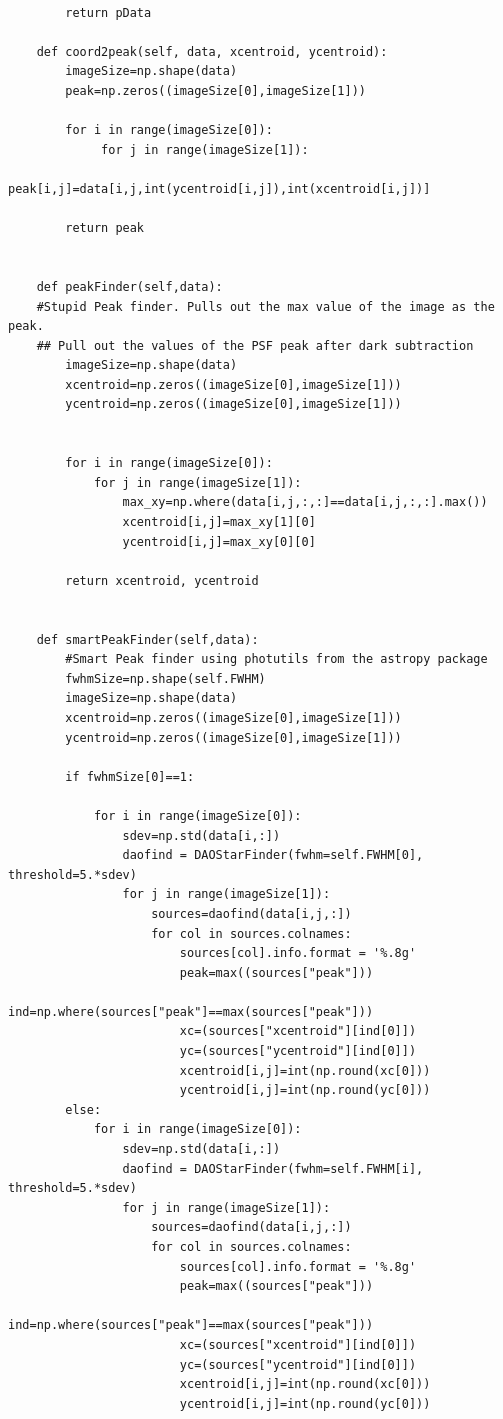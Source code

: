 \begin{lstlisting}
            
        return pData
    
    def coord2peak(self, data, xcentroid, ycentroid):
        imageSize=np.shape(data)
        peak=np.zeros((imageSize[0],imageSize[1]))

        for i in range(imageSize[0]):
             for j in range(imageSize[1]):
                    peak[i,j]=data[i,j,int(ycentroid[i,j]),int(xcentroid[i,j])]
        
        return peak
    
    
    def peakFinder(self,data):
    #Stupid Peak finder. Pulls out the max value of the image as the peak. 
    ## Pull out the values of the PSF peak after dark subtraction
        imageSize=np.shape(data)
        xcentroid=np.zeros((imageSize[0],imageSize[1]))
        ycentroid=np.zeros((imageSize[0],imageSize[1]))
        
        
        for i in range(imageSize[0]):
            for j in range(imageSize[1]):
                max_xy=np.where(data[i,j,:,:]==data[i,j,:,:].max())
                xcentroid[i,j]=max_xy[1][0]
                ycentroid[i,j]=max_xy[0][0]
            
        return xcentroid, ycentroid
        
        
    def smartPeakFinder(self,data):
        #Smart Peak finder using photutils from the astropy package
        fwhmSize=np.shape(self.FWHM)
        imageSize=np.shape(data)
        xcentroid=np.zeros((imageSize[0],imageSize[1]))
        ycentroid=np.zeros((imageSize[0],imageSize[1]))
        
        if fwhmSize[0]==1:

            for i in range(imageSize[0]):
                sdev=np.std(data[i,:])
                daofind = DAOStarFinder(fwhm=self.FWHM[0], threshold=5.*sdev)
                for j in range(imageSize[1]):
                    sources=daofind(data[i,j,:])
                    for col in sources.colnames:
                        sources[col].info.format = '%.8g'
                        peak=max((sources["peak"]))
                        ind=np.where(sources["peak"]==max(sources["peak"]))
                        xc=(sources["xcentroid"][ind[0]])
                        yc=(sources["ycentroid"][ind[0]])     
                        xcentroid[i,j]=int(np.round(xc[0]))
                        ycentroid[i,j]=int(np.round(yc[0]))
        else:  
            for i in range(imageSize[0]):
                sdev=np.std(data[i,:])
                daofind = DAOStarFinder(fwhm=self.FWHM[i], threshold=5.*sdev)
                for j in range(imageSize[1]):
                    sources=daofind(data[i,j,:])
                    for col in sources.colnames:
                        sources[col].info.format = '%.8g'
                        peak=max((sources["peak"]))
                        ind=np.where(sources["peak"]==max(sources["peak"]))
                        xc=(sources["xcentroid"][ind[0]])
                        yc=(sources["ycentroid"][ind[0]])     
                        xcentroid[i,j]=int(np.round(xc[0]))
                        ycentroid[i,j]=int(np.round(yc[0]))
                        

\end{lstlisting}
